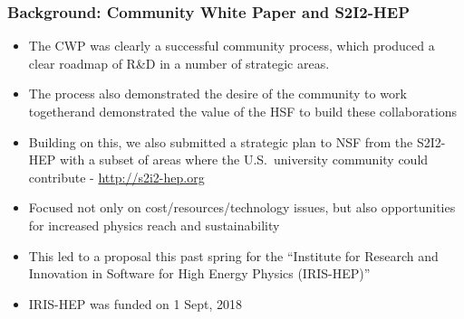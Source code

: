 \begin{frame}
\frametitle{Background: Community White Paper and S2I2-HEP}

\begin{itemize}
\item The CWP was clearly a successful community process, which produced a clear roadmap of R\&D in a number of strategic areas. 
\item The process also demonstrated the desire of the community to work togetherand demonstrated the value of the HSF to build these collaborations
\item Building on this, we also submitted a strategic plan to NSF from the S2I2-HEP with a subset of areas where the U.S.\ university community could contribute - \url{http://s2i2-hep.org}
\item Focused not only on cost/resources/technology issues, but also opportunities for increased physics reach and sustainability
\item This led to a proposal this past spring for the ``Institute for Research and Innovation in Software for High Energy Physics (IRIS-HEP)''
\item IRIS-HEP was funded on 1 Sept, 2018
\end{itemize}

\end{frame}


